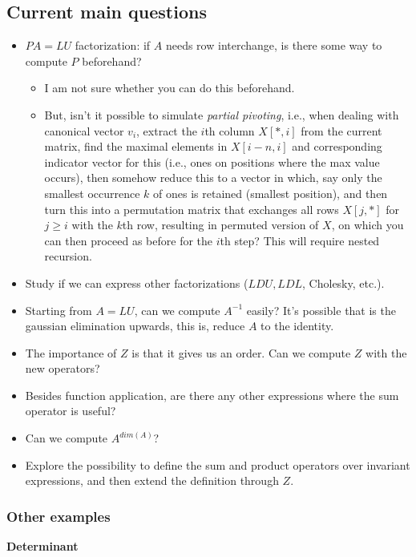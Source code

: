 \subsection{Current main questions}
\begin{itemize}

\item $PA=LU$ factorization: if $A$ needs row interchange, is there some way to compute $P$ beforehand?
\begin{itemize}
\item I am not sure whether you can do this beforehand.
\item But, isn't it possible to simulate \emph{partial pivoting}, i.e., when dealing with canonical vector $v_i$, extract the $i$th column $X[*,i]$ from the current
matrix, find the maximal elements in $X[i-n,i]$ and corresponding indicator vector for this (i.e., ones on positions where the max value occurs), then somehow
reduce this to a vector in which, say only the smallest occurrence $k$ of ones is retained (smallest position), and then turn this into a permutation matrix that exchanges
all rows $X[j,*]$ for $j\geq i$ with the $k$th row, resulting in permuted version of $X$, on which you can then proceed as before for the $i$th step? This will require nested
recursion.
\end{itemize}
\item Study if we can express other factorizations ($LDU, LDL$,
Cholesky, etc.).
\item Starting from $A=LU$, can we compute $A^{-1}$ easily? It's possible that is the gaussian elimination upwards, this is, reduce $A$ to the identity.
\item The importance of $Z$ is that it gives us an order. Can we compute $Z$ with the new operators?
\item Besides function application, are there any other expressions where the sum operator is useful?
\item Can we compute $A^{dim(A)}$?
\item Explore the possibility to define the sum and product operators over invariant expressions, and then extend the definition through $Z$.

\end{itemize}

\subsubsection*{Other examples}

\textbf{Determinant}


